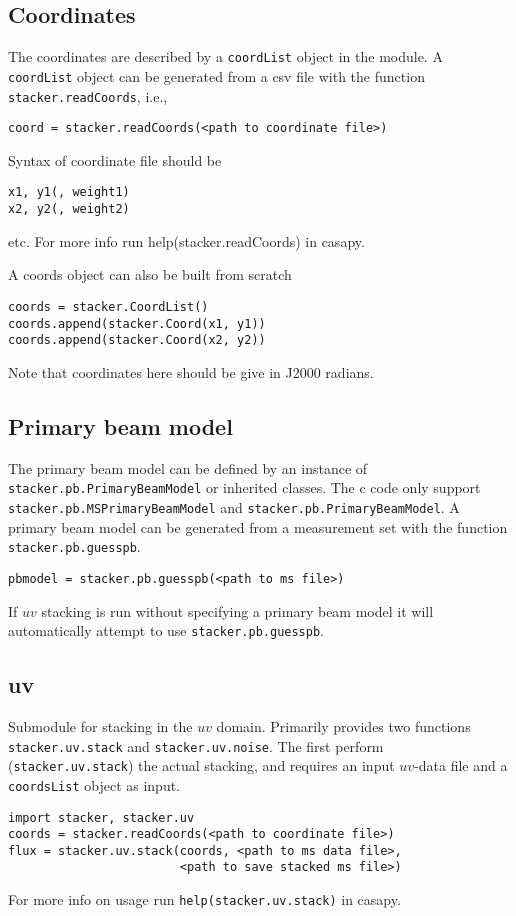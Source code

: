 \documentclass{article}
\begin{document}
\subsection{Coordinates}
The coordinates are described by a {\tt coordList} object in the module.
A {\tt coordList} object can be generated from a csv file with the function {\tt stacker.readCoords},
i.e.,
\begin{verbatim}
coord = stacker.readCoords(<path to coordinate file>)
\end{verbatim}
Syntax of coordinate file should be
\begin{verbatim}
x1, y1(, weight1)
x2, y2(, weight2)
\end{verbatim}
etc. For more info run help(stacker.readCoords) in casapy.


A coords object can also be built from scratch
\begin{verbatim}
coords = stacker.CoordList()
coords.append(stacker.Coord(x1, y1))
coords.append(stacker.Coord(x2, y2))
\end{verbatim}
Note that coordinates here should be give in J2000 radians.

\subsection{Primary beam model}
The primary beam model can be defined by an instance of 
{\tt stacker.pb.PrimaryBeamModel} or inherited classes. The c code only support
{\tt stacker.pb.MSPrimaryBeamModel} and {\tt stacker.pb.PrimaryBeamModel}. 
A primary beam model can be generated from a measurement set with the function
{\tt stacker.pb.guesspb}.
\begin{verbatim}
pbmodel = stacker.pb.guesspb(<path to ms file>)
\end{verbatim}
If $uv$ stacking is run without specifying a primary beam model it will automatically attempt to use {\tt stacker.pb.guesspb}.

\subsection{uv}
Submodule for stacking in the $uv$ domain. 
Primarily provides two functions {\tt stacker.uv.stack} and {\tt stacker.uv.noise}.
The first perform ({\tt stacker.uv.stack}) the actual stacking, 
and requires an input $uv$-data file and a {\tt coordsList} object as input.
\begin{verbatim}
import stacker, stacker.uv
coords = stacker.readCoords(<path to coordinate file>)
flux = stacker.uv.stack(coords, <path to ms data file>, 
                        <path to save stacked ms file>)
\end{verbatim}
For more info on usage run {\tt help(stacker.uv.stack)} in casapy.
\end{document}

